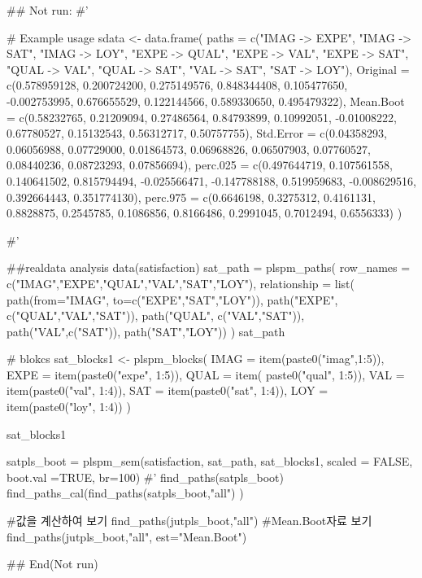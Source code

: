 \documentclass[a4paper]{book}
\begin{document}
\begin{Examples}
\begin{ExampleCode}


\#\# Not run: 
#'

# Example usage
sdata <- data.frame(
  paths = c("IMAG -> EXPE", "IMAG -> SAT", "IMAG -> LOY",
   "EXPE -> QUAL", "EXPE -> VAL", "EXPE -> SAT",
            "QUAL -> VAL", "QUAL -> SAT",
            "VAL -> SAT", "SAT -> LOY"),
  Original = c(0.578959128, 0.200724200, 0.275149576,
   0.848344408, 0.105477650, -0.002753995,
               0.676655529, 0.122144566, 0.589330650, 0.495479322),
  Mean.Boot = c(0.58232765, 0.21209094, 0.27486564,
  0.84793899, 0.10992051, -0.01008222,
                0.67780527, 0.15132543, 0.56312717, 0.50757755),
  Std.Error = c(0.04358293, 0.06056988, 0.07729000,
  0.01864573, 0.06968826, 0.06507903,
                0.07760527, 0.08440236, 0.08723293, 0.07856694),
  perc.025 = c(0.497644719, 0.107561558, 0.140641502,
   0.815794494, -0.025566471, -0.147788188,
               0.519959683, -0.008629516, 0.392664443, 0.351774130),
  perc.975 = c(0.6646198, 0.3275312, 0.4161131,
   0.8828875, 0.2545785, 0.1086856,
               0.8166486, 0.2991045, 0.7012494, 0.6556333)
)

#'

##realdata analysis
data(satisfaction)
sat_path = plspm_paths(
  row_names = c("IMAG","EXPE","QUAL","VAL","SAT","LOY"),
  relationship = list(
    path(from="IMAG", to=c("EXPE","SAT","LOY")),
    path("EXPE", c("QUAL","VAL","SAT")),
    path("QUAL", c("VAL","SAT")),
    path("VAL",c("SAT")),
    path("SAT","LOY"))
)
sat_path

# blokcs
sat_blocks1 <- plspm_blocks(
  IMAG = item(paste0("imag",1:5)),
  EXPE = item(paste0("expe", 1:5)),
  QUAL = item( paste0("qual", 1:5)),
  VAL = item(paste0("val", 1:4)),
  SAT = item(paste0("sat", 1:4)),
  LOY = item(paste0("loy", 1:4))
)

sat_blocks1

satpls_boot = plspm_sem(satisfaction, sat_path, sat_blocks1, scaled = FALSE,
                        boot.val =TRUE, br=100)
#' find_paths(satpls_boot)
find_paths_cal(find_paths(satpls_boot,"all") )

#값을 계산하여 보기
find_paths(jutpls_boot,"all")%
#Mean.Boot자료 보기
find_paths(jutpls_boot,"all", est="Mean.Boot")%




## End(Not run)


\end{ExampleCode}
\end{Examples}
\end{document}

